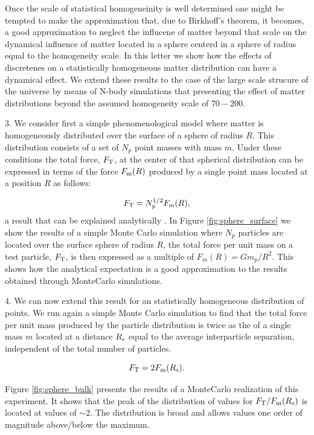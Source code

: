 \documentclass{article}
\newcommand{\hMpc}{{\ifmmode{h^{-1}{\rm Mpc}}\else{$h^{-1}$Mpc }\fi}}
\begin{document}
Once the scale of statistical homogeneinity is well determined one
might be tempted to make the approximation that,
due to Birkhoff's theorem, it becomes, a good approximation to neglect
the influcene of matter beyond that scale on the dynamical influence
of matter located in a sphere centerd in a sphere of radius equal to
the homogeneity scale.  In this letter we show how the effects of
discretenes on a statistically homogeneous matter distribution can
have a dynamical effect. We extend these results to the case of the
large scale strucure of the universe by means of N-body simulations
that presenting the effect of matter distributions beyond the assumed
homogeneity scale of $70-200$\hMpc.
 


3. We consider first a simple phenomenological model where matter is
homogeneously distributed over the surface of a sphere of radius
$R$. This distribution consists of a set of $N_p$ point masses with mass
$m$. Under these conditions the total force, $F_{\rm T}$, at the
center of that spherical distribution can be expressed in terms of the
force $F_{\rm m}(R)$ produced by a single point mass located at a
position  $R$ as follows:  

\begin{equation}
F_{\rm T } = N_p^{1/2} F_{\rm m} (R),
\end{equation}
%
a result that can be explained analytically
\cite{Chandra43,Carati2008}. In Figure \ref{fig:sphere_surface} we
show the results of a simple Monte Carlo simulation where $N_p$
particles are located over the surface sphere of radius $R$, the total force per
unit mass on a test particle, $F_{\rm T}$, is then expressed as a
multiple of $F_{m}(R)=Gm_p/R^2$. This shows how the analytical
expectation is a good approximation to the results obtained through
MonteCarlo simulations.




4. We can now extend this result for an statistically homogeneous distribution
of points. We run again a simple Monte Carlo simulation to find that the total force per unit mass produced by the particle distribution is twice as
the of a single mass $m$ located at a distance $R_{\rm s}$ equal to
the average interparticle separation, independent of the total number of
particles. 

\begin{equation}
F_{\rm T} = 2 F_{\rm m}(R_{\rm s}).
\end{equation}

Figure \ref{fig:sphere_bulk} presents the results of a MonteCarlo
realization of this experiment. It shows that the peak of the
distribution of values for $F_{\rm T}/F_{\rm m}(R_{\rm s})$ is
located at values of $\sim 2$. The distribution is broad and allows
values one order of magnitude above/below the maximum. 
\end{document}
